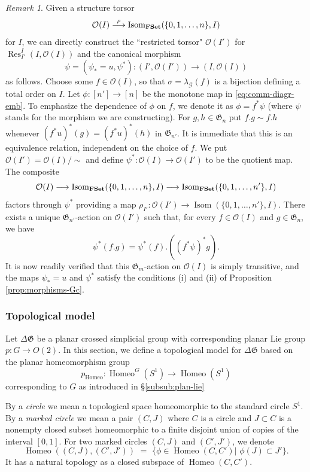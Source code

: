 \documentclass[english,11pt,leqno]{article}
\def\Gen{\mathfrak{G}}
\def\Gc{\mathcal{G}}
\def\Oc{\mathcal{O}}
\def\on{\operatorname}
\def\Res{\operatorname{Res}\nolimits}
\def\lra{\longrightarrow}
\def\O{{\mathcal O}}
\def\Isom{\on{Isom}}
\def\DG{ {\Delta \Gen}}
\def\Homeo{{ \on{Homeo}}}
\def\FSet{{\bf FSet}}
\theoremstyle{definition}
\theoremstyle{remark}
\newtheorem{rem}[thm]{Remark}
\numberwithin{equation}{section}
\begin{document}
\begin{rem}
Given a structure torsor 
\[
\Oc(I)\buildrel \rho\over\lra\Isom_{\FSet}(\{0,1,\dots, n\}, I)
\]
for $I$, we can directly construct the ``restricted torsor" $\Oc(I')$ for $\Res^I_{I'}(I, \Oc(I))$ and the canonical
morphism
\[
\psi=(\psi_*=u, \psi^*): (I', \Oc(I'))\to (I, \Oc(I))
\]
as follows.
Choose some $f\in\Oc(I)$, so that $\sigma=\lambda_{\Gc}(f)$ is a bijection defining a total order on $I$.
Let $\phi: [n']\to[n]$ be the monotone map in \eqref{eq:comm-diagr-emb}. To emphasize the dependence of $\phi$ on
$f$, we denote it as $\phi=f^*\psi$ (where $\psi$ stands for the morphism we are constructing). 
For $g,h\in\Gen_n$ put $f.g\sim f.h$ whenever
$(f^*u)^*(g)=(f^*u)^*(h)$ in $\Gen_{n'}$. It is immediate that this is an equivalence relation, independent on
the choice of $f$. We put $\Oc(I')=\Oc(I)/\sim$ and define $\psi^*: \O(I) \to \O(I')$ to be the quotient map. The composite
	\[
		\O(I) \lra \Isom_{\FSet}(\{0,1,\dots, n\}, I) \lra \Isom_
		{\FSet}(\{0,1,\dots, n'\}, I) 
	\]
	factors through $\psi^*$ providing a map $\rho_{I'}: \O(I') \to \Isom(\{0,1,\dots, n'\}, I)$.
	There exists a unique  $\Gen_{n'}$-action on $\O(I')$ such that, for every $f \in
	\O(I)$ and $g \in \Gen_n$, we have 
	\[
			\psi^*(f.g) = \psi^*(f).((f^*\psi)^*g).
	\]
	 It is now readily verified that this $\Gen_m$-action on $\O(I)$ is simply
	transitive,  and the maps $\psi_*=u$ and $\psi^*$ satisfy the conditions (i) and (ii)
	of Proposition \ref{prop:morphisms-Gc}. 
\end{rem}

\subsubsection{Topological model}
\label{sec:topmodel}

Let $\DG$ be a planar crossed simplicial group with corresponding planar Lie group $p: G \to O(2)$.
In this section, we define a topological model for $\DG$ based on the planar
homeomorphism group
\[
p_\Homeo: \Homeo^G(S^1)\lra\Homeo(S^1)
\]
corresponding to $G$ as introduced in \S \ref{subsub:plan-lie}

By a {\em circle} we mean a topological space homeomorphic to the standard circle $S^1$. By a {\em
marked circle} we mean a pair $(C,J)$ where $C$ is a circle and $J\subset C$ is a nonempty closed
subset homeomorphic to a finite disjoint union of copies of the interval $[0,1]$. For two marked
circles $(C,J)$ and $(C',J')$, we denote
\[
\Homeo((C,J), (C',J')) \,\,=\,\,\bigl\{ \phi\in\Homeo(C,C') \bigl| \,\, \phi(J)\subset J'
\bigr\}. 
\]
It has a natural topology as a closed subspace of $\Homeo(C,C')$. 
\end{document}
